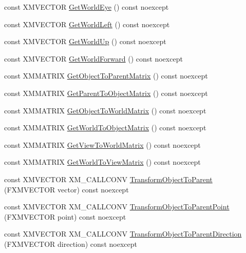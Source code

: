 \begin{DoxyCompactItemize}
\item 
const X\+M\+V\+E\+C\+T\+OR \hyperlink{structmage_1_1_transform_node_a413f7786329b48226572acde4174e484}{Get\+World\+Eye} () const noexcept
\item 
const X\+M\+V\+E\+C\+T\+OR \hyperlink{structmage_1_1_transform_node_af021782ea162e0aa8c891b794d204632}{Get\+World\+Left} () const noexcept
\item 
const X\+M\+V\+E\+C\+T\+OR \hyperlink{structmage_1_1_transform_node_a9d545f02c9d8062a29b236a94c8c2136}{Get\+World\+Up} () const noexcept
\item 
const X\+M\+V\+E\+C\+T\+OR \hyperlink{structmage_1_1_transform_node_a4737be175d69768d353f500636502296}{Get\+World\+Forward} () const noexcept
\item 
const X\+M\+M\+A\+T\+R\+IX \hyperlink{structmage_1_1_transform_node_a0056c77406b7c6fc29f50b1b0de69026}{Get\+Object\+To\+Parent\+Matrix} () const noexcept
\item 
const X\+M\+M\+A\+T\+R\+IX \hyperlink{structmage_1_1_transform_node_a13efbdabf75f4a26fa8512443d0064f0}{Get\+Parent\+To\+Object\+Matrix} () const noexcept
\item 
const X\+M\+M\+A\+T\+R\+IX \hyperlink{structmage_1_1_transform_node_a793fb089a973f6c03bcedabf58ce632e}{Get\+Object\+To\+World\+Matrix} () const noexcept
\item 
const X\+M\+M\+A\+T\+R\+IX \hyperlink{structmage_1_1_transform_node_abdad2523f50f398977abf8dd6c166d89}{Get\+World\+To\+Object\+Matrix} () const noexcept
\item 
const X\+M\+M\+A\+T\+R\+IX \hyperlink{structmage_1_1_transform_node_a16586bae5004e22d543b1b931407f603}{Get\+View\+To\+World\+Matrix} () const noexcept
\item 
const X\+M\+M\+A\+T\+R\+IX \hyperlink{structmage_1_1_transform_node_add9f28faa15d91a451880de4743dd439}{Get\+World\+To\+View\+Matrix} () const noexcept
\item 
const X\+M\+V\+E\+C\+T\+OR X\+M\+\_\+\+C\+A\+L\+L\+C\+O\+NV \hyperlink{structmage_1_1_transform_node_a8a19577750036d8365cca5b4e38c08b9}{Transform\+Object\+To\+Parent} (F\+X\+M\+V\+E\+C\+T\+OR vector) const noexcept
\item 
const X\+M\+V\+E\+C\+T\+OR X\+M\+\_\+\+C\+A\+L\+L\+C\+O\+NV \hyperlink{structmage_1_1_transform_node_a449428a24f76ca18b91f84ba3e69c0f3}{Transform\+Object\+To\+Parent\+Point} (F\+X\+M\+V\+E\+C\+T\+OR point) const noexcept
\item 
const X\+M\+V\+E\+C\+T\+OR X\+M\+\_\+\+C\+A\+L\+L\+C\+O\+NV \hyperlink{structmage_1_1_transform_node_af3f7d31eeb595ac51fe2362c91688398}{Transform\+Object\+To\+Parent\+Direction} (F\+X\+M\+V\+E\+C\+T\+OR direction) const noexcept

\end{DoxyCompactItemize}
